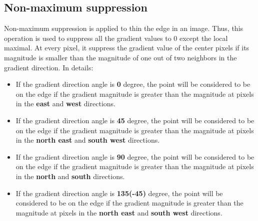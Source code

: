 	\subsection{Non-maximum suppression}
	Non-maximum suppression is applied to thin the edge in an image. Thus, this operation is used to suppress all the gradient values to 0 except the local maximal. At every pixel, it suppress the gradient value of the center pixels if its magnitude is smaller than the magnitude of one out of two neighbors in the gradient direction. In details:
	\begin{itemize}
	\item If the gradient direction angle is \textbf{0} degree, the point will be considered to be on the edge if the gradient magnitude is greater than the magnitude at pixels in the \textbf{east} and \textbf{west} directions.
	\item If the gradient direction angle is \textbf{45} degree, the point will be considered to be on the edge if the gradient magnitude is greater than the magnitude at pixels in the \textbf{north east} and \textbf{south west} directions.
	\item If the gradient direction angle is \textbf{90} degree, the point will be considered to be on the edge if the gradient magnitude is greater than the magnitude at pixels in the \textbf{north} and \textbf{south} directions.
	\item If the gradient direction angle is \textbf{135(-45)} degree, the point will be considered to be on the edge if the gradient magnitude is greater than the magnitude at pixels in the \textbf{north east} and \textbf{south west} directions.
	\end{itemize}
